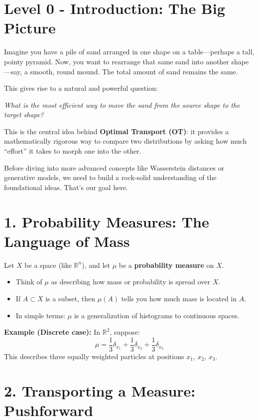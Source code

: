 \documentclass[11pt]{article}
\begin{document}
\newpage
{}
\section*{Level 0 - Introduction: The Big Picture}
Imagine you have a pile of sand arranged in one shape on a table---perhaps a tall, pointy pyramid. Now, you want to rearrange that same sand into another shape---say, a smooth, round mound. The total amount of sand remains the same.

\vspace{0.5em}
\noindent This gives rise to a natural and powerful question:

\begin{center}
\textit{What is the most efficient way to move the sand from the source shape to the target shape?}
\end{center}

This is the central idea behind \textbf{Optimal Transport (OT)}: it provides a mathematically rigorous way to compare two distributions by asking how much ``effort'' it takes to morph one into the other.

Before diving into more advanced concepts like Wasserstein distances or generative models, we need to build a rock-solid understanding of the foundational ideas. That's our goal here.

\section*{1. Probability Measures: The Language of Mass}

Let $X$ be a space (like $\mathbb{R}^n$), and let $\mu$ be a \textbf{probability measure} on $X$.

\begin{itemize}
    \item Think of $\mu$ as describing how mass or probability is spread over $X$.
    \item If $A \subset X$ is a subset, then $\mu(A)$ tells you how much mass is located in $A$.
    \item In simple terms: $\mu$ is a generalization of histograms to continuous spaces.
\end{itemize}

\textbf{Example (Discrete case):} In $\mathbb{R}^2$, suppose:
\[
\mu = \frac{1}{3}\delta_{x_1} + \frac{1}{3}\delta_{x_2} + \frac{1}{3}\delta_{x_3}
\]
This describes three equally weighted particles at positions $x_1$, $x_2$, $x_3$.

\section*{2. Transporting a Measure: Pushforward}
\end{document}
